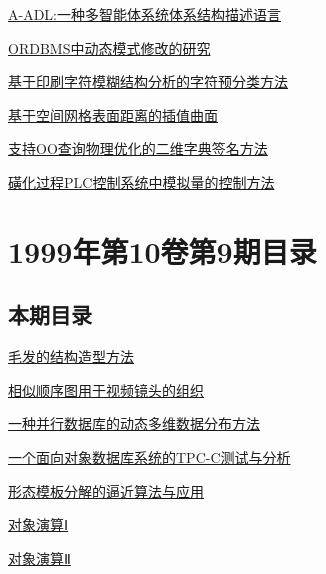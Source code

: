 \documentclass[a4paper]{article}
\begin{document}
\href{http://www.jos.org.cn/ch/reader/download_pdf.aspx?file_no=20001018&year_id=2000&quarter_id=10&falg=1}{A-ADL:一种多智能体系统体系结构描述语言}

\href{http://www.jos.org.cn/ch/reader/download_pdf.aspx?file_no=20001019&year_id=2000&quarter_id=10&falg=1}{ORDBMS中动态模式修改的研究}

\href{http://www.jos.org.cn/ch/reader/download_pdf.aspx?file_no=20001020&year_id=2000&quarter_id=10&falg=1}{基于印刷字符模糊结构分析的字符预分类方法}

\href{http://www.jos.org.cn/ch/reader/download_pdf.aspx?file_no=20001021&year_id=2000&quarter_id=10&falg=1}{基于空间网格表面距离的插值曲面}

\href{http://www.jos.org.cn/ch/reader/download_pdf.aspx?file_no=20001022&year_id=2000&quarter_id=10&falg=1}{支持OO查询物理优化的二维字典签名方法}

\href{http://www.jos.org.cn/ch/reader/download_pdf.aspx?file_no=20001023&year_id=2000&quarter_id=10&falg=1}{磺化过程PLC控制系统中模拟量的控制方法}


\section{\textbf{1999年第10卷第9期目录}}
\subsection{本期目录}
\href{http://www.jos.org.cn/ch/reader/download_pdf.aspx?file_no=19990901&year_id=1999&quarter_id=9&falg=1}{毛发的结构造型方法}

\href{http://www.jos.org.cn/ch/reader/download_pdf.aspx?file_no=19990902&year_id=1999&quarter_id=9&falg=1}{相似顺序图用于视频镜头的组织}

\href{http://www.jos.org.cn/ch/reader/download_pdf.aspx?file_no=19990903&year_id=1999&quarter_id=9&falg=1}{一种并行数据库的动态多维数据分布方法}

\href{http://www.jos.org.cn/ch/reader/download_pdf.aspx?file_no=19990904&year_id=1999&quarter_id=9&falg=1}{一个面向对象数据库系统的TPC-C测试与分析}

\href{http://www.jos.org.cn/ch/reader/download_pdf.aspx?file_no=19990905&year_id=1999&quarter_id=9&falg=1}{形态模板分解的逼近算法与应用}

\href{http://www.jos.org.cn/ch/reader/download_pdf.aspx?file_no=19990906&year_id=1999&quarter_id=9&falg=1}{对象演算Ⅰ}

\href{http://www.jos.org.cn/ch/reader/download_pdf.aspx?file_no=19990907&year_id=1999&quarter_id=9&falg=1}{对象演算Ⅱ}
\end{document}

